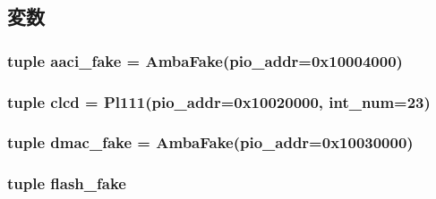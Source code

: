 \subsection{変数}
\hypertarget{classRealView_1_1RealViewEB_a40e0278b62fc0e814579ee52118d2e2a}{
\subsubsection[{aaci\_\-fake}]{\setlength{\rightskip}{0pt plus 5cm}tuple {\bf aaci\_\-fake} = {\bf AmbaFake}(pio\_\-addr=0x10004000)}}
\label{classRealView_1_1RealViewEB_a40e0278b62fc0e814579ee52118d2e2a}
\hypertarget{classRealView_1_1RealViewEB_aca2e883cdc9c636e4500344d5892f6c9}{
\subsubsection[{clcd}]{\setlength{\rightskip}{0pt plus 5cm}tuple {\bf clcd} = {\bf Pl111}(pio\_\-addr=0x10020000, int\_\-num=23)}}
\label{classRealView_1_1RealViewEB_aca2e883cdc9c636e4500344d5892f6c9}
\hypertarget{classRealView_1_1RealViewEB_acbc3f8e786184963ae1388d9d9a981be}{
\subsubsection[{dmac\_\-fake}]{\setlength{\rightskip}{0pt plus 5cm}tuple {\bf dmac\_\-fake} = {\bf AmbaFake}(pio\_\-addr=0x10030000)}}
\label{classRealView_1_1RealViewEB_acbc3f8e786184963ae1388d9d9a981be}
\hypertarget{classRealView_1_1RealViewEB_a6dbb35031fbd3dbded6e05ca5db58c8e}{
\subsubsection[{flash\_\-fake}]{\setlength{\rightskip}{0pt plus 5cm}tuple {\bf flash\_\-fake}}}
